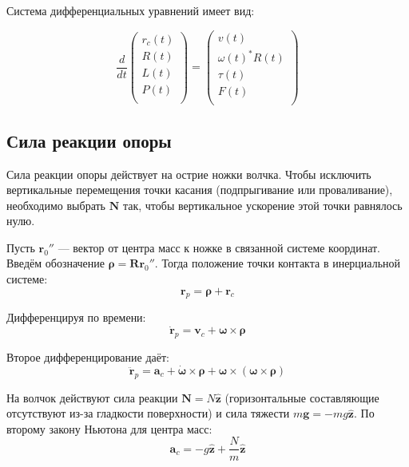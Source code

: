 \documentclass{article}
\begin{document}
Система дифференциальных уравнений имеет вид:


\[
\frac{d}{dt}\begin{pmatrix}
r_c(t)\\
R(t)\\
L(t)\\
P(t)\\
\end{pmatrix} = 
\begin{pmatrix}
v(t)\\
\omega(t)^*R(t)\\
\tau(t)\\
F(t)\\
\end{pmatrix}
\]





\subsection{Сила реакции опоры}

Сила реакции опоры действует на острие ножки волчка. 
Чтобы исключить вертикальные перемещения точки касания (подпрыгивание или проваливание), необходимо выбрать $\mathbf{N}$ так, чтобы вертикальное ускорение этой точки равнялось нулю.

Пусть $\mathbf{r}_0''$ --- вектор от центра масс к ножке в связанной системе координат. 
Введём обозначение $\boldsymbol{\rho} = \mathbf{R} \mathbf{r}_0''$. 
Тогда положение точки контакта в инерциальной системе:
\begin{equation}
\mathbf{r}_p = \boldsymbol{\rho} + \mathbf{r}_c
\end{equation}

Дифференцируя по времени:
\begin{equation}
\dot{\mathbf{r}}_p = \mathbf{v}_c + \boldsymbol{\omega} \times \boldsymbol{\rho}
\end{equation}

Второе дифференцирование даёт:
\begin{equation}
\ddot{\mathbf{r}}_p = \mathbf{a}_c + \dot{\boldsymbol{\omega}} \times \boldsymbol{\rho} + \boldsymbol{\omega} \times (\boldsymbol{\omega} \times \boldsymbol{\rho}) \label{eq:rp_ddot}
\end{equation}

На волчок действуют сила реакции $\mathbf{N} = N \hat{\mathbf{z}}$ (горизонтальные составляющие отсутствуют из-за гладкости поверхности) и сила тяжести $m\mathbf{g} = -mg\hat{\mathbf{z}}$. 
По второму закону Ньютона для центра масс:
\begin{equation}
\mathbf{a}_c = -g \hat{\mathbf{z}} + \frac{N}{m} \hat{\mathbf{z}} \label{eq:ac}
\end{equation}
\end{document}
